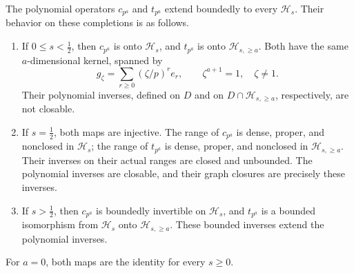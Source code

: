 \begin{theorem}
\label{v4-arith:ado:weighted-inverse}
The polynomial operators \(c_{p^a}\) and \(t_{p^a}\) extend boundedly
to every \(\mathcal H_s\). Their behavior on these completions is as
follows.
\begin{enumerate}
\item If \(0\le s<\tfrac12\), then \(c_{p^a}\) is onto
\(\mathcal H_s\), and \(t_{p^a}\) is onto
\(\mathcal H_{s,\ge a}\). Both have the same \(a\)-dimensional
kernel, spanned by
\[
 g_\zeta=\sum_{r\ge0}(\zeta/p)^r e_r,
 \qquad \zeta^{a+1}=1,\quad \zeta\ne1.
\]
Their polynomial inverses, defined on \(D\) and on
\(D\cap\mathcal H_{s,\ge a}\), respectively, are not closable.
\item If \(s=\tfrac12\), both maps are injective.
The range of \(c_{p^a}\) is dense, proper, and nonclosed in
\(\mathcal H_s\); the range of \(t_{p^a}\) is dense, proper, and
nonclosed in \(\mathcal H_{s,\ge a}\).
Their inverses on their actual ranges are closed and unbounded.
The polynomial inverses are closable, and their graph closures are
precisely these inverses.
\item If \(s>\tfrac12\), then \(c_{p^a}\) is boundedly invertible
on \(\mathcal H_s\), and \(t_{p^a}\) is a bounded isomorphism from
\(\mathcal H_s\) onto \(\mathcal H_{s,\ge a}\).
These bounded inverses extend the polynomial inverses.
\end{enumerate}
For \(a=0\), both maps are the identity for every \(s\ge0\).
\end{theorem}
